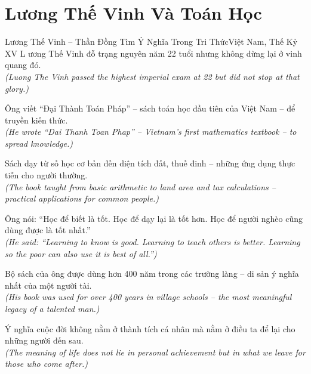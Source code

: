 \section{Lương Thế Vinh Và Toán Học}
\begin{truyen}{Lương Thế Vinh -- Thần Đồng Tìm Ý Nghĩa Trong Tri Thức}{Việt Nam, Thế Kỷ XV}
L ương Thế Vinh đỗ trạng nguyên năm 22 tuổi nhưng không dừng lại ở vinh quang đó.\\
\textit{(Luong The Vinh passed the highest imperial exam at 22 but did not stop at that glory.)}

Ông viết ``Đại Thành Toán Pháp'' -- sách toán học đầu tiên của Việt Nam -- để truyền kiến thức.\\
\textit{(He wrote ``Dai Thanh Toan Phap'' -- Vietnam's first mathematics textbook -- to spread knowledge.)}

Sách dạy từ số học cơ bản đến diện tích đất, thuế đinh -- những ứng dụng thực tiễn cho người thường.\\
\textit{(The book taught from basic arithmetic to land area and tax calculations -- practical applications for common people.)}

Ông nói: ``Học để biết là tốt. Học để dạy lại là tốt hơn. Học để người nghèo cũng dùng được là tốt nhất.''\\
\textit{(He said: ``Learning to know is good. Learning to teach others is better. Learning so the poor can also use it is best of all.'')}

Bộ sách của ông được dùng hơn 400 năm trong các trường làng -- di sản ý nghĩa nhất của một người tài.\\
\textit{(His book was used for over 400 years in village schools -- the most meaningful legacy of a talented man.)}

\end{truyen}
\begin{baihoc}
  Ý nghĩa cuộc đời không nằm ở thành tích cá nhân mà nằm ở điều ta để lại cho những người đến sau.\\
  \textit{(The meaning of life does not lie in personal achievement but in what we leave for those who come after.)}
\end{baihoc}
